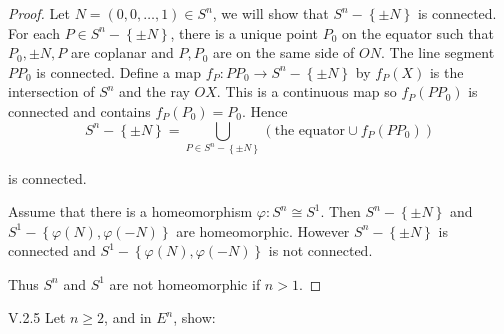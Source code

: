 \begin{proof}
	Let \( N = (0, 0, \ldots, 1) \in S^{n} \), we will show that \( S^{n} - \left\{ \pm N \right\} \) is connected. For each \( P \in S^{n} - \left\{ \pm N \right\} \), there is a unique point \( P_{0} \) on the equator such that \( P_{0}, \pm N, P \) are coplanar and \( P, P_{0} \) are on the same side of \( ON \). The line segment \( PP_{0} \) is connected. Define a map \( f_{P}: PP_{0} \to S^{n} - \left\{ \pm N \right\} \) by \( f_{P}(X) \) is the intersection of \( S^{n} \) and the ray \( OX \). This is a continuous map so \( f_{P}(PP_{0}) \) is connected and contains \( f_{P}(P_{0}) = P_{0} \). Hence
	\[
		S^{n} - \left\{\pm N\right\} = \bigcup_{P \in S^{n} - \left\{\pm N\right\}} (\text{the equator} \cup f_{P}(PP_{0}))
	\]

	is connected.

	Assume that there is a homeomorphism \( \varphi: S^{n} \cong S^{1} \). Then \( S^{n} - \left\{ \pm N \right\} \) and \( S^{1} - \left\{ \varphi(N), \varphi(-N) \right\} \) are homeomorphic. However \( S^{n} - \left\{ \pm N \right\} \) is connected and \( S^{1} - \left\{ \varphi(N), \varphi(-N) \right\} \) is not connected.

	Thus \( S^{n} \) and \( S^{1} \) are not homeomorphic if \( n > 1 \).
\end{proof}

\begin{problem}{V.2.5}
Let \( n \ge 2 \), and in \( E^{n} \), show:
\end{problem}

